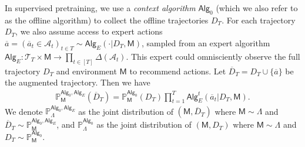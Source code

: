 \documentclass[10pt]{article}
\newcommand{\<}{\left\langle}
\renewcommand{\>}{\right\rangle}
\renewcommand{\P}{\mathbb{P}}
\newcommand{\inst}{{\mathsf{M}}}
\newcommand{\trajsp}{{\mathcal{T}}}
\newcommand{\widebar}[1]{\overline{#1}}
\newcommand{\eaction}{{\widebar{a}}}
\newcommand{\totlen}{{T}}
\newcommand{\sAlg}{{\mathsf{Alg}}}
\newcommand{\dset}{{D}}
\newcommand{\adset}{{\widebar{D}}}
\newcommand{\prior}{{\Lambda}}
\newcommand{\actionsp}{{\mathcal{A}}}
\newcommand{\shortexp}{{E}}
\begin{document}
In supervised pretraining, we use a \textit{context algorithm} $\sAlg_0$ (which we also refer to as the offline algorithm) to collect the offline trajectories $\dset_\totlen$. For each trajectory $\dset_\totlen$, we also assume access to expert actions $\eaction = ( \eaction_t \in \actionsp_t )_{t \in \totlen} \sim \sAlg_{\shortexp}(\cdot | \dset_\totlen, \inst)$, sampled from an expert algorithm $\sAlg_{\shortexp}: \trajsp_\totlen \times \inst \to \prod_{t \in [\totlen]} \Delta(\actionsp_t)$. This expert could omnisciently observe the full trajectory $\dset_\totlen$ and environment $\inst$ to recommend actions. Let $\adset_\totlen = \dset_\totlen \cup \{ \eaction \}$ be the augmented trajectory. Then we have
\begin{align*}
\textstyle \P^{\sAlg_0,\sAlg_{\shortexp}}_{\inst}(\adset_\totlen)=\P^{\sAlg_0}_{\inst}(\dset_\totlen)\prod_{t=1}^\totlen \sAlg_{\shortexp}^t (\eaction_t|\dset_{\totlen},\inst).
\end{align*}
We denote $\P^{\sAlg_0,\sAlg_\shortexp}_{\prior}$ as the joint distribution of $(\inst,\adset_\totlen)$ where $\inst \sim \prior$ and $\adset_\totlen \sim \P^{\sAlg_0,\sAlg_\shortexp}_{\inst}$, and $\P^{\sAlg_0}_{\prior}$ as the joint distribution of $(\inst,\dset_\totlen)$ where $\inst \sim \prior$ and $\dset_\totlen \sim \P^{\sAlg_0}_{\inst}$. 
\end{document}

